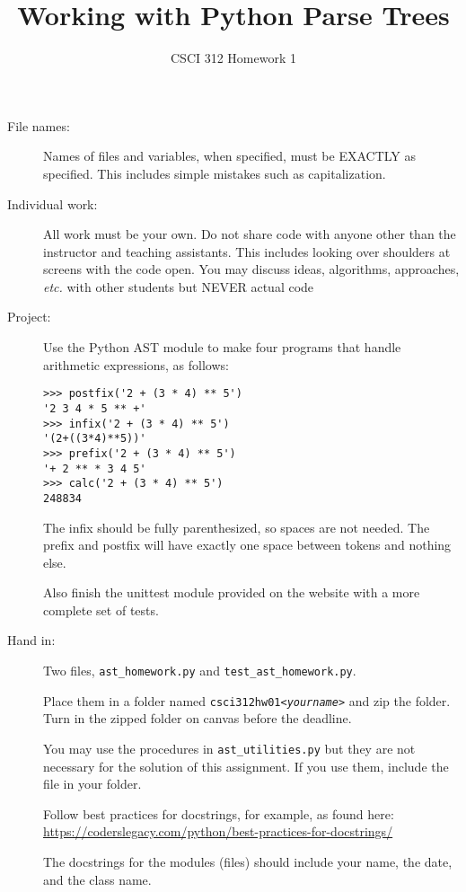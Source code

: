 \documentclass[12pt]{article}
\author{CSCI 312 Homework 1}
\title{Working with Python Parse Trees}
\begin{document}
\maketitle
\begin{description}

\item[File names:]  Names of files and variables, when specified,
must be EXACTLY as specified.  This includes simple mistakes such
as capitalization.

\item[Individual work:]  All work must be your own.  Do not share
code with anyone other than the instructor and teaching assistants.
This includes looking over shoulders at screens with the code open.
You may discuss ideas, algorithms, approaches, {\em etc.} with
other students but NEVER actual code

\item[Project:] Use the Python AST module to make four
programs that handle arithmetic expressions, as follows:  
\begin{lstlisting}
>>> postfix('2 + (3 * 4) ** 5')
'2 3 4 * 5 ** +'
>>> infix('2 + (3 * 4) ** 5')
'(2+((3*4)**5))'
>>> prefix('2 + (3 * 4) ** 5')
'+ 2 ** * 3 4 5'
>>> calc('2 + (3 * 4) ** 5')
248834
\end{lstlisting}
The infix should be fully parenthesized, so spaces are not
needed.  The prefix and postfix will have exactly one
space between tokens and nothing else.

Also finish the unittest module provided on the website
with a more complete set of tests.

\item[Hand in:] Two files, \lstinline{ast_homework.py}
and \lstinline{test_ast_homework.py}. 

Place them in a
folder named {\tt csci312hw01<{\sl yourname}>} and zip
the folder.  Turn in the zipped folder on canvas before
the deadline.

You may use the procedures in \lstinline{ast_utilities.py}
but they are not necessary for the solution of this assignment.
If you use them, include the file in your folder.

Follow best practices for docstrings, for example,
as found here: \url{https://coderslegacy.com/python/best-practices-for-docstrings/}

The docstrings for the modules (files) should include
your name, the date, and the class name.


\end{description}
\end{document}
